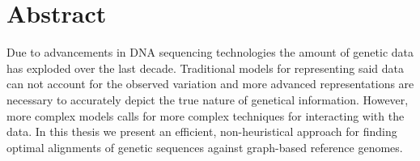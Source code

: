 \documentclass[thesis.tex]{subfiles}
\begin{document}
\chapter*{Abstract}
Due to advancements in DNA sequencing technologies the amount of genetic data has exploded over the last decade. Traditional models for representing said data can not account for the observed variation and more advanced representations are necessary to accurately depict the true nature of genetical information. However, more complex models calls for more complex techniques for interacting with the data. In this thesis we present an efficient, non-heuristical approach for finding optimal alignments of genetic sequences against graph-based reference genomes.
\end{document}
